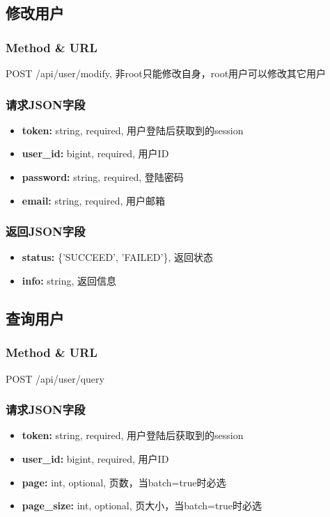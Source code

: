 ﻿\documentclass[a4paper]{report}
\begin{document}
\subsection{修改用户} %
\subsubsection{Method \& URL} %
POST /api/user/modify, 非root只能修改自身，root用户可以修改其它用户

\subsubsection{请求JSON字段}
\begin{itemize}
	\item \textbf{token:} string, required, 用户登陆后获取到的session
	\item \textbf{user\_id:} bigint, required, 用户ID
	\item \textbf{password:} string, required, 登陆密码
	\item \textbf{email:} string, required, 用户邮箱
\end{itemize}

\subsubsection{返回JSON字段}
\begin{itemize}
	\item \textbf{status:} \{'SUCCEED', 'FAILED'\}, 返回状态
	\item \textbf{info:} string, 返回信息
\end{itemize}



\subsection{查询用户} %
\subsubsection{Method \& URL} %
POST /api/user/query 

\subsubsection{请求JSON字段}
\begin{itemize}
	\item \textbf{token:} string, required, 用户登陆后获取到的session
	\item \textbf{user\_id:} bigint, required, 用户ID
	\item \textbf{page:} int, optional, 页数，当batch=true时必选
	\item \textbf{page\_size:} int, optional, 页大小，当batch=true时必选
\end{itemize}
\end{document}
